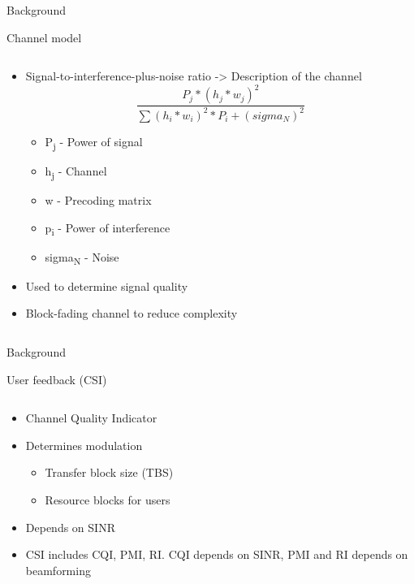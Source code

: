\documentclass[xcolor={cmyk}]{beamer}
\begin{document}
 \begin{frame}{Background}
 	\begin{block}{Channel model}
		\begin{columns}
			\begin{column}{.9\textwidth}
				\begin{itemize}
					\item Signal-to-interference-plus-noise ratio -> Description of the channel
					\begin{equation*}
\frac{P_j*(h_j*w_j)^{2}}{\sum (h_i*w_i)^{2}*P_i+(sigma_N)^{2}}
					\end{equation*}
					\begin{itemize}
						\item P\textsubscript{j} - Power of signal
						\item h\textsubscript{j} - Channel
						\item w - Precoding matrix
						\item p\textsubscript{i} - Power of interference
						\item sigma\textsubscript{N} - Noise
					\end{itemize}
					\item Used to determine signal quality
					\item Block-fading channel to reduce complexity
				\end{itemize}
			\end{column}
		\end{columns}
	 \end{block}
 \end{frame}

 \begin{frame}{Background}
 	\begin{block}{User feedback (CSI)}
		\begin{columns}
			\begin{column}{.9\textwidth}
				\begin{itemize}
					\item Channel Quality Indicator
					\item Determines modulation
					\begin{itemize}
						\item Transfer block size (TBS)
						\item Resource blocks for users
					\end{itemize}
					\item Depends on SINR
					\item CSI includes CQI, PMI, RI. CQI depends on SINR, PMI and RI depends on beamforming
				\end{itemize}
			\end{column}
		\end{columns}
	 \end{block}
 \end{frame}
\end{document}
